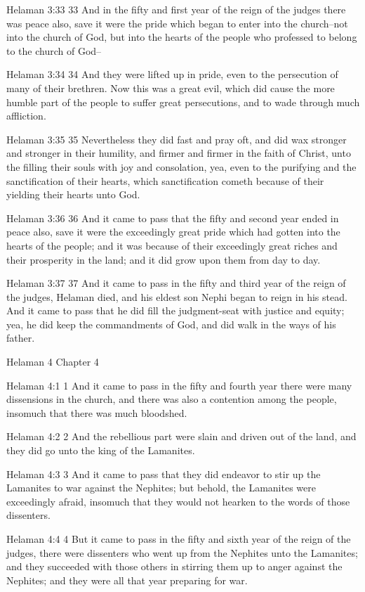 Helaman 3:33
 33 And in the fifty and first year of the reign of the judges
there was peace also, save it were the pride which began to enter
into the church--not into the church of God, but into the hearts
of the people who professed to belong to the church of God--

Helaman 3:34
 34 And they were lifted up in pride, even to the persecution of
many of their brethren. Now this was a great evil, which did
cause the more humble part of the people to suffer great
persecutions, and to wade through much affliction.

Helaman 3:35
 35 Nevertheless they did fast and pray oft, and did wax stronger
and stronger in their humility, and firmer and firmer in the
faith of Christ, unto the filling their souls with joy and
consolation, yea, even to the purifying and the sanctification of
their hearts, which sanctification cometh because of their
yielding their hearts unto God.

Helaman 3:36
 36 And it came to pass that the fifty and second year ended in
peace also, save it were the exceedingly great pride which had
gotten into the hearts of the people; and it was because of their
exceedingly great riches and their prosperity in the land; and it
did grow upon them from day to day.

Helaman 3:37
 37 And it came to pass in the fifty and third year of the reign
of the judges, Helaman died, and his eldest son Nephi began to
reign in his stead. And it came to pass that he did fill the
judgment-seat with justice and equity; yea, he did keep the
commandments of God, and did walk in the ways of his father.

Helaman 4
Chapter 4

Helaman 4:1
 1 And it came to pass in the fifty and fourth year there were
many dissensions in the church, and there was also a contention
among the people, insomuch that there was much bloodshed.

Helaman 4:2
 2 And the rebellious part were slain and driven out of the land,
and they did go unto the king of the Lamanites.

Helaman 4:3
 3 And it came to pass that they did endeavor to stir up the
Lamanites to war against the Nephites; but behold, the Lamanites
were exceedingly afraid, insomuch that they would not hearken to
the words of those dissenters.

Helaman 4:4
 4 But it came to pass in the fifty and sixth year of the reign
of the judges, there were dissenters who went up from the
Nephites unto the Lamanites; and they succeeded with those others
in stirring them up to anger against the Nephites; and they were
all that year preparing for war.

